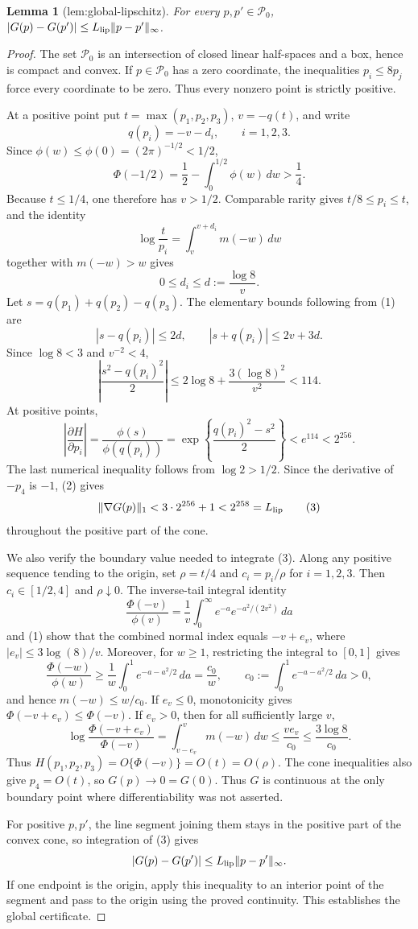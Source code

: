 \documentclass{article}
\newtheorem{lemma}{Lemma}
\begin{document}
\begin{lemma}[lem:global-lipschitz]\label{lem:global-lipschitz}
For every \(p,p'\in\mathcal P_0\), \(|G(p)-G(p')|\le L_{\rm lip}\lVert p-p'\rVert_{\infty}\).
\end{lemma}
\begin{proof}
The set \(\mathcal P_0\) is an intersection of closed linear half-spaces and a box, hence is compact and convex.  If \(p\in\mathcal P_0\) has a zero coordinate, the inequalities \(p_i\le8p_j\) force every coordinate to be zero.  Thus every nonzero point is strictly positive.

At a positive point put \(t=\max(p_1,p_2,p_3)\), \(v=-q(t)\), and write
\[
q(p_i)=-v-d_i,\qquad i=1,2,3.
\]
Since \(\phi(w)\le\phi(0)=(2\pi)^{-1/2}<1/2\),
\[
\Phi(-1/2)=\frac12-\int_0^{1/2}\phi(w)\,dw>\frac14.
\]
Because \(t\le1/4\), one therefore has \(v>1/2\).  Comparable rarity gives \(t/8\le p_i\le t\), and the identity
\[
\log\frac{t}{p_i}=\int_v^{v+d_i}m(-w)\,dw
\]
together with \(m(-w)>w\) gives
\[
0\le d_i\le d:=\frac{\log8}{v}.
\tag{1}
\]
Let \(s=q(p_1)+q(p_2)-q(p_3)\).  The elementary bounds following from (1) are
\[
|s-q(p_i)|\le2d,
\qquad |s+q(p_i)|\le2v+3d.
\]
Since \(\log8<3\) and \(v^{-2}<4\),
\[
\left|\frac{s^2-q(p_i)^2}{2}\right|
\le2\log8+\frac{3(\log8)^2}{v^2}<114.
\tag{2}
\]
At positive points,
\[
\left|\frac{\partial H}{\partial p_i}\right|
=\frac{\phi(s)}{\phi(q(p_i))}
=\exp\left\{\frac{q(p_i)^2-s^2}{2}\right\}<e^{114}<2^{256}.
\]
The last numerical inequality follows from \(\log2>1/2\).  Since the derivative of \(-p_4\) is \(-1\), (2) gives
\[
\|\nabla G(p)\|_1<3\cdot2^{256}+1<2^{258}=L_{\rm lip}
\tag{3}
\]
throughout the positive part of the cone.

We also verify the boundary value needed to integrate (3).  Along any positive sequence tending to the origin, set \(\rho=t/4\) and \(c_i=p_i/\rho\) for \(i=1,2,3\).  Then \(c_i\in[1/2,4]\) and \(\rho\downarrow0\).  The inverse-tail integral identity
\[
\frac{\Phi(-v)}{\phi(v)}=\frac1v\int_0^\infty e^{-a}e^{-a^2/(2v^2)}\,da
\]
and (1) show that the combined normal index equals \(-v+e_v\), where \(|e_v|\le3\log(8)/v\).  Moreover, for \(w\ge1\), restricting the integral to \([0,1]\) gives
\[
\frac{\Phi(-w)}{\phi(w)}\ge
\frac1w\int_0^1e^{-a-a^2/2}\,da=\frac{c_0}{w},
\qquad c_0:=\int_0^1e^{-a-a^2/2}\,da>0,
\]
and hence \(m(-w)\le w/c_0\).  If \(e_v\le0\), monotonicity gives \(\Phi(-v+e_v)\le\Phi(-v)\).  If \(e_v>0\), then for all sufficiently large \(v\),
\[
\log\frac{\Phi(-v+e_v)}{\Phi(-v)}
=\int_{v-e_v}^{v}m(-w)\,dw
\le \frac{ve_v}{c_0}\le\frac{3\log8}{c_0}.
\]
Thus \(H(p_1,p_2,p_3)=O\{\Phi(-v)\}=O(t)=O(\rho)\).  The cone inequalities also give \(p_4=O(t)\), so \(G(p)\to0=G(0)\).  Thus \(G\) is continuous at the only boundary point where differentiability was not asserted.

For positive \(p,p'\), the line segment joining them stays in the positive part of the convex cone, so integration of (3) gives
\[
|G(p)-G(p')|\le L_{\rm lip}\|p-p'\|_\infty.
\]
If one endpoint is the origin, apply this inequality to an interior point of the segment and pass to the origin using the proved continuity.  This establishes the global certificate.
\end{proof}
\end{document}
